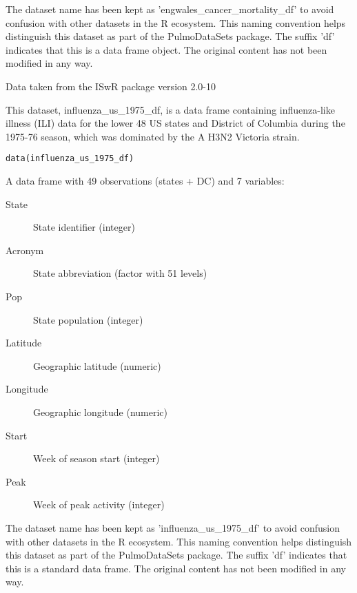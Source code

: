 \documentclass[a4paper]{book}
\begin{document}
%
\begin{Details}
The dataset name has been kept as 'engwales\_cancer\_mortality\_df' to avoid confusion
with other datasets in the R ecosystem. This naming convention helps distinguish
this dataset as part of the PulmoDataSets package. The suffix 'df' indicates
that this is a data frame object. The original content has not been modified
in any way.
\end{Details}
%
\begin{Source}
Data taken from the ISwR package version 2.0-10
\end{Source}
%
\begin{Description}
This dataset, influenza\_us\_1975\_df, is a data frame containing influenza-like illness (ILI)
data for the lower 48 US states and District of Columbia during the 1975-76 season,
which was dominated by the A H3N2 Victoria strain.
\end{Description}
%
\begin{Usage}
\begin{verbatim}
data(influenza_us_1975_df)
\end{verbatim}
\end{Usage}
%
\begin{Format}
A data frame with 49 observations (states + DC) and 7 variables:
\begin{description}

\item[State] State identifier (integer)
\item[Acronym] State abbreviation (factor with 51 levels)
\item[Pop] State population (integer)
\item[Latitude] Geographic latitude (numeric)
\item[Longitude] Geographic longitude (numeric)
\item[Start] Week of season start (integer)
\item[Peak] Week of peak activity (integer)

\end{description}

\end{Format}
%
\begin{Details}
The dataset name has been kept as 'influenza\_us\_1975\_df' to avoid confusion with other
datasets in the R ecosystem. This naming convention helps distinguish this dataset
as part of the PulmoDataSets package. The suffix 'df' indicates that this is a
standard data frame. The original content has not been modified in any way.
\end{Details}
\end{document}
